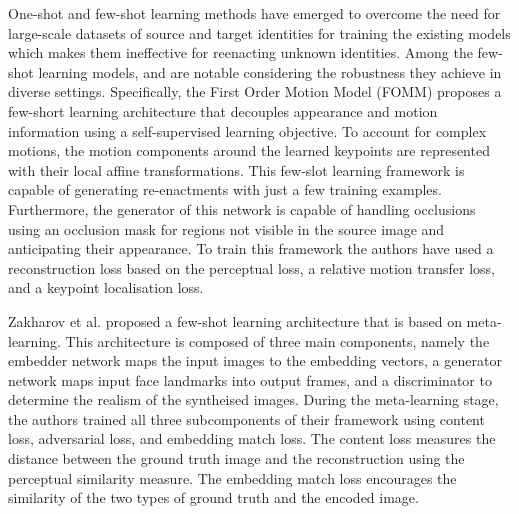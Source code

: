 One-shot and few-shot learning methods have emerged to overcome the need for large-scale datasets of source and target identities for training the existing models which makes them ineffective for reenacting unknown identities. Among the few-shot learning models, \cite{siarohin2019first} and \cite{zakharov2019few} are notable considering the robustness they achieve in diverse settings. Specifically, the First Order Motion Model (FOMM) \cite{siarohin2019first} proposes a few-short learning architecture that decouples appearance and motion information using a self-supervised learning objective.  To account for complex motions, the motion components around the learned keypoints are represented with their local affine transformations. This few-slot learning framework is capable of generating re-enactments with just a few training examples. Furthermore, the generator of this network is capable of handling occlusions using an occlusion mask for regions not visible in the source image and anticipating their appearance. To train this framework the authors have used a reconstruction loss based on the perceptual loss, a relative motion transfer loss, and a keypoint localisation loss. 


Zakharov et al. \cite{zakharov2019few} proposed a few-shot learning architecture that is based on meta-learning. This architecture is composed of three main components, namely the embedder network maps the input images to the embedding vectors, a generator network maps input face landmarks into output frames, and a discriminator to determine the realism of the syntheised images. During the meta-learning stage, the authors trained all three subcomponents of their framework using content loss, adversarial loss, and embedding match loss. The content loss measures the distance between the ground truth image and the reconstruction using the perceptual similarity measure. The embedding match loss encourages the similarity of the two types of ground truth and the encoded image. 

